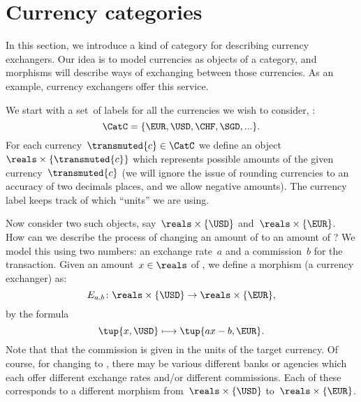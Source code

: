 \section{Currency categories}
\label{sec:currency_cat}
In this section, we introduce a kind of category for describing currency exchangers. Our idea is to model currencies as objects of a category, and morphisms will describe ways of exchanging between those currencies. As an example, currency exchangers offer this service.

We start with a set~\CatC of labels for all the currencies we wish to consider, \text{\ie }:
\begin{equation*}
  \CatC = \{ \EUR, \USD, \CHF, \SGD, ... \}.
\end{equation*}
For each currency~$\transmuted{c} \in \CatC$ we define an object~$\reals \times \{\transmuted{c}\}$ which represents possible amounts of the given currency~$\transmuted{c}$ (we will ignore the issue of rounding currencies to an accuracy of two decimals places, and we allow negative amounts). The currency label keeps track of which ``units'' we are using.

Now consider two such objects, say~$\reals \times \{\USD\}$ and~$\reals \times \{\EUR\}$. How can we describe the process of changing an amount of \USD to an amount of \EUR? We model this using two numbers: an exchange rate~$a$ and a commission~$b$ for the transaction. Given an amount~$x \in \reals$ of \USD, we define a morphism (a currency exchanger) as:
\begin{equation*}
  E_{a,b} \colon \reals \times \{\USD\} \rightarrow \reals \times \{\EUR\},
\end{equation*}
by the formula
\begin{equation*}
  \tup{x, \USD} \longmapsto \tup{ax - b, \EUR}.
\end{equation*}
Note that that the commission is given in the units of the target currency. Of course, for changing \USD to \EUR, there may be various different banks or agencies which each offer different exchange rates and/or different commissions. Each of these corresponds to a different morphism from~$\reals \times \{\USD\}$ to~$\reals \times \{\EUR\}$.

